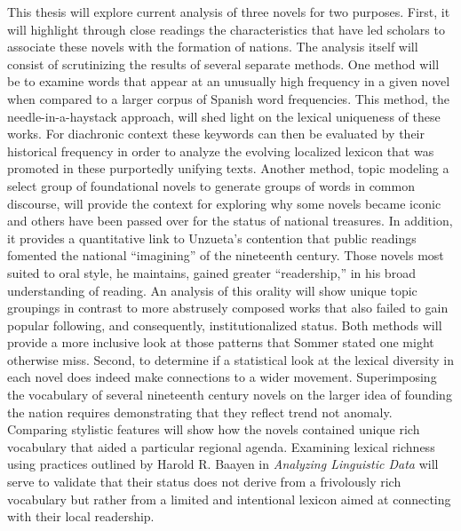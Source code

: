 \documentclass[12pt]{report}
\begin{document}
This thesis will explore  current analysis of three novels for two purposes. 
First, it will highlight through close readings the characteristics that have led scholars to associate these novels with the formation of nations. 
The analysis itself will consist of scrutinizing the results of several separate methods. 
One method will be to examine words that appear at an unusually high frequency in a given novel when compared to a larger corpus of Spanish word frequencies. 
This method, the needle-in-a-haystack approach, will shed light on the lexical uniqueness of these works\nocite{Cvrcek2014}. For diachronic context these keywords can then be evaluated by their historical frequency in order to analyze the evolving localized lexicon that was promoted in these purportedly unifying texts. 
Another method, topic modeling a select group of foundational novels to generate groups of words in common discourse, will provide the context for exploring why some novels became iconic and others have been passed over for the status of national treasures. 
In addition, it provides a quantitative link to Unzueta's contention that public readings fomented the national \enquote{imagining} of the nineteenth century. 
Those novels most suited to oral style, he maintains, gained greater \enquote{readership,} in his broad understanding of reading. 
An analysis of this orality will show unique topic groupings in contrast to more abstrusely composed works that also failed to gain popular following, and consequently, institutionalized status. 
Both methods will provide a more inclusive look at those patterns that Sommer stated one might otherwise miss. 
Second, to determine if a statistical look at the lexical diversity  in each novel does indeed make connections to a wider movement. 
Superimposing the vocabulary of several nineteenth century novels on the larger idea of founding the nation requires demonstrating that they reflect trend not anomaly. 
Comparing stylistic features will show how the novels contained unique rich vocabulary that aided a particular regional agenda. 
Examining lexical richness using practices outlined by Harold R. Baayen in \textit{Analyzing Linguistic Data} will serve to validate that their status does not derive from a frivolously rich vocabulary but rather from a limited and intentional lexicon aimed at connecting with their local readership\nocite{Baayen2008}.
\end{document}

